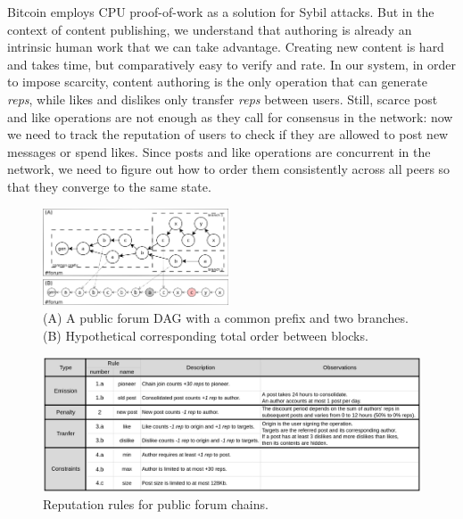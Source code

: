 \documentclass[10pt,journal,compsoc]{IEEEtran}
\newcommand{\reps}     {\emph{reps}\xspace}
\begin{document}
Bitcoin employs CPU proof-of-work as a solution for Sybil attacks.
But in the context of content publishing, we understand that authoring is
already an intrinsic human work that we can take advantage.
Creating new content is hard and takes time, but comparatively easy to verify
and rate.
In our system, in order to impose scarcity, content authoring is the only
operation that can generate \reps, while likes and dislikes only transfer \reps
between users.
%
Still, scarce post and like operations are not enough as they call for
consensus in the network: now we need to track the reputation of users to check
if they are allowed to post new messages or spend likes.
Since posts and like operations are concurrent in the network, we need to
figure out how to order them consistently across all peers so that they
converge to the same state.

\begin{figure}[t]
\centering
\includegraphics[width=0.49\textwidth]{reps2.png}
\caption{
    (A) A public forum DAG with a common prefix and two branches.
    (B) Hypothetical corresponding total order between blocks.
}
\label{fig.reps}
\end{figure}

\begin{figure}[ht]
\centering
\includegraphics[width=\textwidth]{rules.png}
\caption{Reputation rules for public forum chains.}
\label{fig.rules}
\end{figure}
\end{document}
